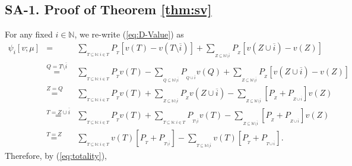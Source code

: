 \documentclass[a4paper,12pt]{article}
\begin{document}
\subsection*{SA-1. Proof of  Theorem \ref{thm:sv}}
\noindent
For any fixed $i\in \mathbb{N}$,  we re-write (\ref{eq:D-Value})  as
\begin{equation}\label{eq:rewrite}\tag{A.1}
\begin{array}{rcl}
\psi_i[v;\mu]&=&
\sum\limits_{_{T\subseteq \mathbb{N}: i \in T}}P_{_T}[v(T)-v(T\setminus\overline{i})]
	+\sum\limits_{_{Z\subseteq \mathbb{N}\setminus \overline{i}}}P_{_Z}[v(Z\cup \overline{i})-v(Z)]\\

&\stackrel{Q=T\setminus \overline{i}}{=}& \sum\limits_{_{T\subseteq \mathbb{N}: i \in  T}} P_{_T} v(T)
	-\sum\limits_{_{Q\subseteq \mathbb{N}\setminus \overline{i}}}  P_{_{Q\cup \overline{i}}} v(Q)
	+\sum\limits_{_{Z\subseteq \mathbb{N}\setminus \overline{i}}}P_{_Z}[v(Z\cup \overline{i})-v(Z)]\\

&\stackrel{Z=Q}{=}& \sum\limits_{_{T\subseteq \mathbb{N}: i \in T}} P_{_T} v(T)
	+ \sum\limits_{_{Z\subseteq \mathbb{N}\setminus \overline{i}}}P_{_Z} v(Z\cup \overline{i})
	-\sum\limits_{_{Z\subseteq \mathbb{N}\setminus \overline{i}}}  [ P_{_Z} + P_{_{Z\cup \overline{i}}}]v(Z)\\

&\stackrel{T=Z\cup \overline{i}}{=}& \sum\limits_{_{T\subseteq \mathbb{N}: i \in T}} P_{_T} v(T)
+ \sum\limits_{_{T\subseteq \mathbb{N}: i \in T}}P_{_{T\setminus \overline{i}}} v(T)
-\sum\limits_{_{Z\subseteq \mathbb{N}\setminus \overline{i}}}  [ P_{_Z} + P_{_{Z\cup \overline{i}}}]v(Z)\\

&\stackrel{T=Z}{=}&\sum\limits_{_{T\subseteq \mathbb{N}: i \in T}}v(T)[P_{_T}+P_{_{T\setminus \overline{i}}}] 
	- \sum\limits_{_{T\subseteq \mathbb{N}\setminus \overline{i}}}v(T)[P_{_T}+P_{_{T\cup\overline{i}}}].
\end{array}
\end{equation}
Therefore, by (\ref{eq:totality}), 
\end{document}
